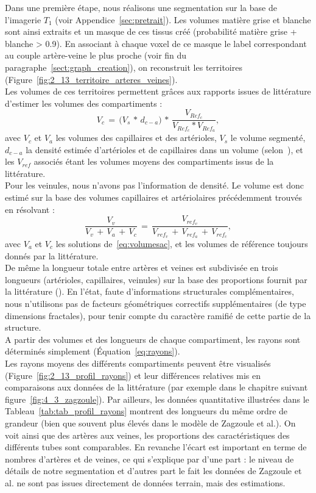 Dans une première étape, nous réalisons une segmentation sur la base de l’imagerie $T_1$ (voir Appendice~\ref{sec:pretrait}). Les volumes matière grise et blanche sont ainsi extraits et un masque de ces tissus créé (probabilité matière grise + blanche > 0.9). En associant à chaque voxel de ce masque le label correspondant au couple artère-veine le plus proche (voir fin du paragraphe~\ref{sect:graph_creation}), on reconstruit les territoires (Figure~\ref{fig:2_13_territoire_arteres_veines}). \\
Les volumes de ces territoires permettent grâces aux rapports issues de littérature d’estimer les volumes des compartiments : 
\begin{equation}
\label{eq:volumesac}
V_{c}\,=\,\bigl(V_{s}\, *\,d_{c-a}\bigr)\, *\,\frac{V_{Ref_{c}}}{V_{Ref_{c}}*V_{Ref_{a}}},
\end{equation}
avec $V_c$ et $V_a$  les volumes des capillaires et des artérioles, $V_s$ le volume segmenté, $d_{c-a}$ la densité estimée d'artérioles et de capillaires dans un volume (selon~\cite{Moody2004}), et les $V_{ref}$ associés étant les volumes moyens des compartiments issus de la littérature.\\
Pour les veinules, nous n’avons pas l’information de densité. Le volume est donc estimé sur la base des volumes capillaires et artériolaires précédemment trouvés en résolvant : 
\begin{equation}
\frac{V_{v}}{V_v\,+\,V_a\,+\,V_c}\,=\,\frac{V_{ref_{v}}}{V_{ref_{v}}\,+\,V_{ref_{a}}\,+\,V_{ref_{c}}},
\end{equation}
avec $V_a$ et $V_c$ les solutions de~\ref{eq:volumesac}, et les volumes de référence toujours donnés par la littérature.\\
De même la longueur totale entre artères et veines est subdivisée en trois longueurs (artérioles, capillaires, veinules) sur la base des proportions fournit par la littérature (\cite{Zagzoule1986}). En l’état, faute d’informations structurales complémentaires, nous n’utilisons pas de facteurs géométriques correctifs supplémentaires (de type dimensions fractales), pour tenir compte du caractère ramifié de cette partie de la structure. \\
A partir des volumes et des longueurs de chaque compartiment, les rayons sont déterminés simplement (Équation~\ref{eq:rayons}). \\
Les rayons moyens des différents compartiments peuvent être visualisés (Figure~\ref{fig:2_13_profil_rayons}) et leur différences relatives mis en comparaisons aux données de la littérature (par exemple dans le chapitre suivant figure~\ref{fig:4_3_zagzoule}). Par ailleurs, les données quantitative illustrées dans le Tableau~\ref{tab:tab_profil_rayons} montrent des longueurs du même ordre de grandeur (bien que souvent plus élevés dans le modèle de Zagzoule et al.). On voit ainsi que des artères aux veines, les proportions des caractéristiques des différents tubes sont comparables. En revanche l'écart est important en terme de nombres d'artères et de veines, ce qui s'explique par d'une part : le niveau de détails de notre segmentation et d'autres part le fait les données de Zagzoule et al. ne sont pas issues directement de données terrain, mais des estimations.\\
